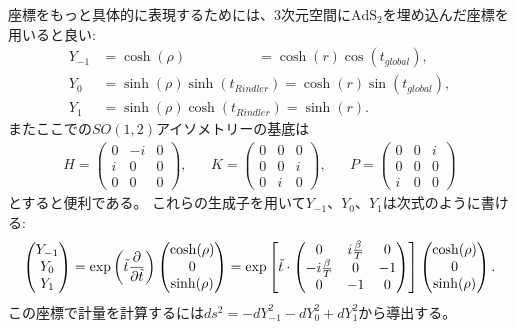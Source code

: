 座標をもっと具体的に表現するためには、3次元空間に$\mathrm{AdS}_2$を埋め込んだ座標を用いると良い:
\begin{align}
	Y_{-1} &= \cosh(\rho) \hspace{61pt} = \cosh(r)\cos(t_{global}),\nonumber\\
	Y_0    &= \sinh(\rho)\sinh(t_{Rindler}) = \cosh(r)\sin(t_{global}),\\
	Y_1    &= \sinh(\rho)\cosh(t_{Rindler}) = \sinh(r)\nonumber.
\end{align}
またここでの$SO(1,2)$アイソメトリーの基底は
\begin{align}
	H = \begin{pmatrix}
		0 & -i & 0\\
		i & 0 & 0\\
		0 & 0 & 0
	\end{pmatrix},\hspace{20pt}
	K = \begin{pmatrix}
		0 & 0 & 0\\
		0 & 0 & i\\
		0 & i & 0
	\end{pmatrix},\hspace{20pt}
	P = \begin{pmatrix}
		0 & 0 & i\\
		0 & 0 & 0\\
		i & 0 & 0
	\end{pmatrix}
\end{align}
とすると便利である。
これらの生成子を用いて$Y_{-1}$、$Y_0$、$Y_1$は次式のように書ける:
\begin{align}
	\begin{pmatrix} Y_{-1} \\ Y_0 \\ Y_1 \end{pmatrix}
	= \exp\left(\tilde{t}\frac{\partial}{\partial \tilde{t}}\right)\begin{pmatrix} \cosh(\rho) \\ 0 \\ \sinh(\rho) \end{pmatrix}
	= \exp\left[
		\tilde{t}\cdot\begin{pmatrix}
			0 & i\frac{\beta}{T} & 0\\
			-i\frac{\beta}{T} & 0 & -1\\
			0 & -1 & 0
		\end{pmatrix}
	\right]\begin{pmatrix} \cosh(\rho) \\ 0 \\ \sinh(\rho) \end{pmatrix}.
\end{align}
この座標で計量を計算するには$ds^2 = -dY_{-1}^2 - dY_0^2 + dY_1^2$から導出する。


\pagebreak